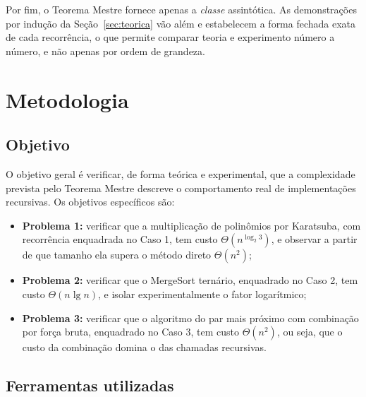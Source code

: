 \documentclass[11pt,a4paper]{article}
\begin{document}
Por fim, o Teorema Mestre fornece apenas a \emph{classe} assintótica. As demonstrações por indução da Seção~\ref{sec:teorica} vão além e estabelecem a forma fechada exata de cada recorrência, o que permite comparar teoria e experimento número a número, e não apenas por ordem de grandeza.

\section{Metodologia}

\subsection{Objetivo}

O objetivo geral é verificar, de forma teórica e experimental, que a complexidade prevista pelo Teorema Mestre descreve o comportamento real de implementações recursivas. Os objetivos específicos são:

\begin{itemize}[itemsep=1pt]
  \item \textbf{Problema 1:} verificar que a multiplicação de polinômios por Karatsuba, com recorrência enquadrada no Caso 1, tem custo $\Theta(n^{\log_2 3})$, e observar a partir de que tamanho ela supera o método direto $\Theta(n^2)$;
  \item \textbf{Problema 2:} verificar que o MergeSort ternário, enquadrado no Caso 2, tem custo $\Theta(n\lg n)$, e isolar experimentalmente o fator logarítmico;
  \item \textbf{Problema 3:} verificar que o algoritmo do par mais próximo com combinação por força bruta, enquadrado no Caso 3, tem custo $\Theta(n^2)$, ou seja, que o custo da combinação domina o das chamadas recursivas.
\end{itemize}

\subsection{Ferramentas utilizadas}
\end{document}
